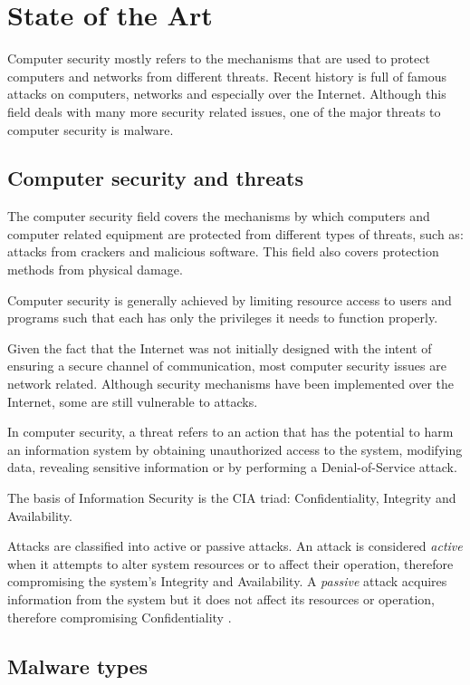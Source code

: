 \chapter{State of the Art}
\label{chapter:second}

Computer security mostly refers to the mechanisms that are used to protect computers and networks from different threats. Recent history is full of famous attacks on computers, networks and especially over the Internet. Although this field deals with many more security related issues, one of the major threats to computer security is malware.

\section{Computer security and threats}

The computer security field covers the mechanisms by which computers and computer related equipment are protected from different types of threats, such as: attacks from crackers and malicious software. This field also covers protection methods from physical damage.

Computer security is generally achieved by limiting resource access to users and programs such that each has only the privileges it needs to function properly.

Given the fact that the Internet was not initially designed with the intent of ensuring a secure channel of communication, most computer security issues are network related. Although security mechanisms have been implemented over the Internet, some are still vulnerable to attacks.

In computer security, a threat refers to an action that has the potential to harm an information system by obtaining unauthorized access to the system, modifying data, revealing sensitive information or by performing a Denial-of-Service attack.

The basis of Information Security is the CIA triad: Confidentiality, Integrity and Availability.

Attacks are classified into active or passive attacks. An attack is considered \textit{active} when it attempts to alter system resources or to affect their operation, therefore compromising the system's Integrity and Availability.
A \textit{passive} attack acquires information from the system but it does not affect its resources or operation, therefore compromising Confidentiality \cite{rfc2828}.

\section{Malware types}
\label{sec:mal-types}

